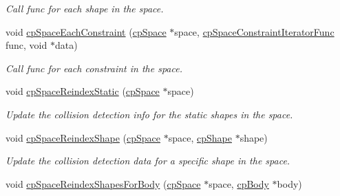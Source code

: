 \begin{DoxyCompactItemize}
\begin{DoxyCompactList}\small\item\em Call {\ttfamily func} for each shape in the space. \end{DoxyCompactList}\item 
\hypertarget{group__cp_space_gac388d8f773c2e080b214734af63a5b64}{}void \hyperlink{group__cp_space_gac388d8f773c2e080b214734af63a5b64}{cp\+Space\+Each\+Constraint} (\hyperlink{structcp_space}{cp\+Space} $\ast$space, \hyperlink{group__cp_space_ga0bf20ed2411342352dc43b71c60649c1}{cp\+Space\+Constraint\+Iterator\+Func} func, void $\ast$data)\label{group__cp_space_gac388d8f773c2e080b214734af63a5b64}

\begin{DoxyCompactList}\small\item\em Call {\ttfamily func} for each constraint in the space. \end{DoxyCompactList}\item 
\hypertarget{group__cp_space_gad703cfe24cb148c49c6dd30aa6b091ff}{}void \hyperlink{group__cp_space_gad703cfe24cb148c49c6dd30aa6b091ff}{cp\+Space\+Reindex\+Static} (\hyperlink{structcp_space}{cp\+Space} $\ast$space)\label{group__cp_space_gad703cfe24cb148c49c6dd30aa6b091ff}

\begin{DoxyCompactList}\small\item\em Update the collision detection info for the static shapes in the space. \end{DoxyCompactList}\item 
\hypertarget{group__cp_space_ga4dfab7bb0c43e49b321a5620c459f9d2}{}void \hyperlink{group__cp_space_ga4dfab7bb0c43e49b321a5620c459f9d2}{cp\+Space\+Reindex\+Shape} (\hyperlink{structcp_space}{cp\+Space} $\ast$space, \hyperlink{structcp_shape}{cp\+Shape} $\ast$shape)\label{group__cp_space_ga4dfab7bb0c43e49b321a5620c459f9d2}

\begin{DoxyCompactList}\small\item\em Update the collision detection data for a specific shape in the space. \end{DoxyCompactList}\item 
\hypertarget{group__cp_space_ga93a9cc05205923058aa6c2dcdaeb2d44}{}void \hyperlink{group__cp_space_ga93a9cc05205923058aa6c2dcdaeb2d44}{cp\+Space\+Reindex\+Shapes\+For\+Body} (\hyperlink{structcp_space}{cp\+Space} $\ast$space, \hyperlink{structcp_body}{cp\+Body} $\ast$body)\label{group__cp_space_ga93a9cc05205923058aa6c2dcdaeb2d44}


\end{DoxyCompactItemize}
